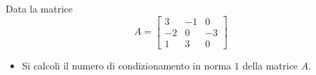 Data la matrice
\bigskip
\[
A=\left[
\begin{array}{ccc}
3 & -1 & 0 \\
-2 & 0 & -3\\
1 & 3 & 0
\end{array}\right]
\]


\begin{itemize}
\item Si calcoli il numero di condizionamento in norma $1$ della matrice $A$.
\end{itemize}
